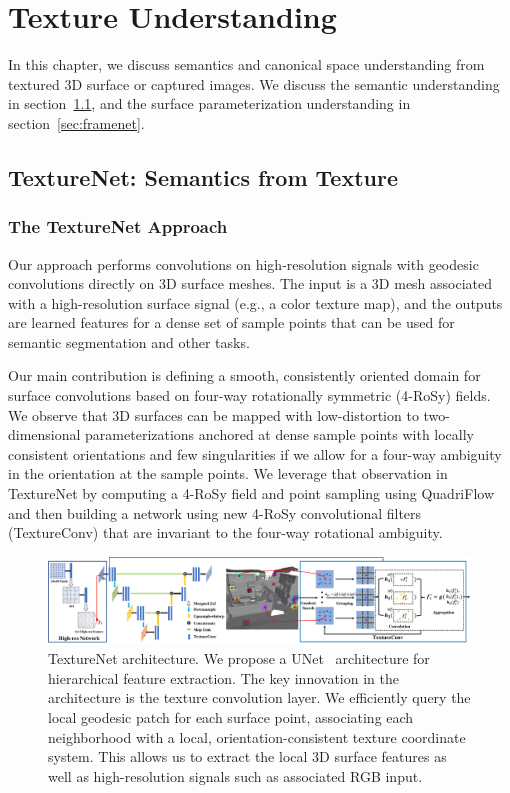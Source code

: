 \chapter{Texture Understanding}
\label{chapter:texturenet}
In this chapter, we discuss semantics and canonical space understanding from textured 3D surface or captured images. We discuss the semantic understanding in section~\ref{sec:texturenet}, and the surface parameterization understanding in section~\ref{sec:framenet}.

\section{TextureNet: Semantics from Texture}
\label{sec:texturenet}

\subsection{The TextureNet Approach}
Our approach performs convolutions on high-resolution signals with geodesic convolutions directly on 3D surface meshes.
The input is a 3D mesh associated with a high-resolution surface signal (e.g., a color texture map), and the outputs are learned features for a dense set of sample points that can be used for semantic segmentation and other tasks.   

Our main contribution is defining a smooth, consistently oriented domain for surface convolutions based on four-way rotationally symmetric (4-RoSy) fields.   We observe that 3D surfaces can be mapped with low-distortion to two-dimensional parameterizations anchored at dense sample points with locally consistent orientations and few singularities if we allow for a four-way ambiguity in the orientation at the sample points.   We leverage that observation in TextureNet by computing a 4-RoSy field and point sampling using QuadriFlow~\cite{huang2018quadriflow} and then building a network using new 4-RoSy convolutional filters (TextureConv) that are invariant to the four-way rotational ambiguity.   

\begin{figure}
\includegraphics[width=\linewidth]{texturenet/diagram/network.pdf}
\caption{TextureNet architecture. We propose a UNet~\cite{ronneberger2015u} architecture for hierarchical feature extraction. The key innovation in the architecture is the texture convolution layer. We efficiently query the local geodesic patch for each surface point, associating each neighborhood with a local, orientation-consistent texture coordinate system. This allows us to extract the local 3D surface features as well as high-resolution signals such as associated RGB input.}
\label{fig:texturenet-approach-network}
\end{figure}

